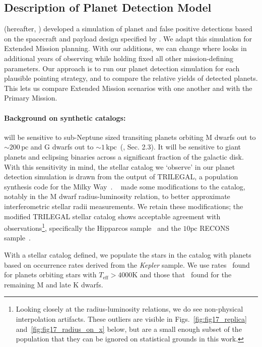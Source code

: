 \subsection{Description of Planet Detection Model}
\label{sec:planet_detection_model}

\citet{Sullivan_2015} (hereafter, )
developed a simulation of \tesss planet and false positive detections
based on the spacecraft and payload design specified by
\citet{ricker_transiting_2014}.  We adapt this simulation for Extended
Mission planning.  With our additions, we can change where \tess looks
in additional years of observing while holding fixed all other
mission-defining parameters.  Our approach is to run our planet
detection simulation for each plausible pointing strategy, and to
compare the relative yields of detected planets.  This lets us compare
Extended Mission scenarios with one another and with the Primary
Mission.

\paragraph{Background on synthetic catalogs:}

\tess will be sensitive to sub-Neptune sized transiting planets orbiting M
dwarfs out to $\sim\!200\,\text{pc}$ and G dwarfs out to
$\sim\!1\,\text{kpc}$~(, Sec. 2.3).  It will be
sensitive to giant planets and eclipsing binaries across a significant
fraction of the galactic disk.  With this sensitivity in mind, the
stellar catalog we `observe' in our planet detection simulation is
drawn from the output of TRILEGAL, a population synthesis code for the
Milky Way~\citep{girardi_star_2005}.  ~ made
some modifications to the catalog, notably in the M dwarf
radius-luminosity relation, to better approximate interferometric
stellar radii measurements.  We retain these modifications; the modified
TRILEGAL stellar catalog shows acceptable agreement with
observations\footnote{Looking closely at the radius-luminosity
  relations, we do see non-physical interpolation artifacts. These
  outliers are visible in Figs.~\ref{fig:fig17_replica}
  and~\ref{fig:fig17_radius_on_x} below, but are a small enough subset
  of the population that they can be ignored on statistical grounds in this 
  work.}, specifically
the Hipparcos
sample~\citep{perryman_hipparcos_1997,van_leeuwen_validation_2007} and
the $10\text{pc}$ RECONS sample~\citep{henry_solar_2006}.

With a stellar catalog defined, we populate the stars in the catalog
with planets based on occurrence rates derived from the
\textit{Kepler} sample.  We use rates~\citet{fressin_false_2013} found
for planets orbiting stars with $T_\text{eff} > 4000\text{K}$ and
those that~\citet{dressing_occurrence_2015} found for the remaining M
and late K dwarfs.

